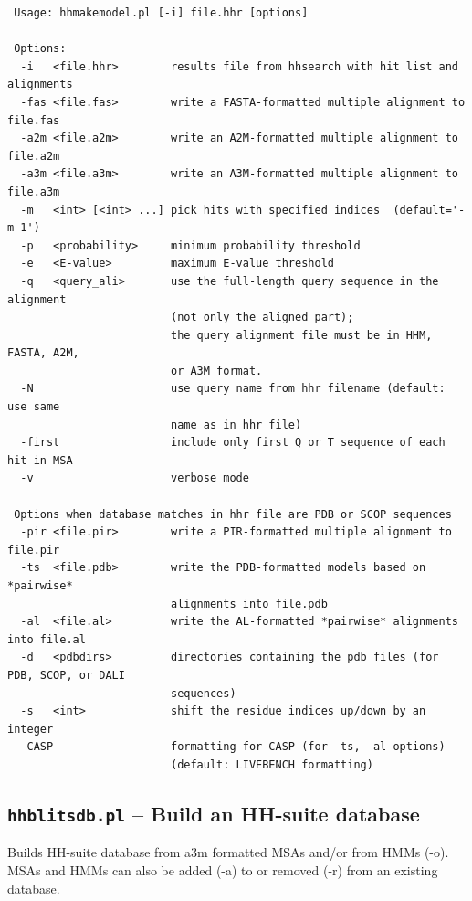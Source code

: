 \documentclass[11pt,a4paper]{article}
\begin{document}
\small 
\begin{verbatim}
 Usage: hhmakemodel.pl [-i] file.hhr [options]

 Options:
  -i   <file.hhr>        results file from hhsearch with hit list and alignments
  -fas <file.fas>        write a FASTA-formatted multiple alignment to file.fas
  -a2m <file.a2m>        write an A2M-formatted multiple alignment to file.a2m
  -a3m <file.a3m>        write an A3M-formatted multiple alignment to file.a3m
  -m   <int> [<int> ...] pick hits with specified indices  (default='-m 1')
  -p   <probability>     minimum probability threshold     
  -e   <E-value>         maximum E-value threshold      
  -q   <query_ali>       use the full-length query sequence in the alignment 
                         (not only the aligned part);
                         the query alignment file must be in HHM, FASTA, A2M,  
                         or A3M format.
  -N                     use query name from hhr filename (default: use same  
                         name as in hhr file)
  -first                 include only first Q or T sequence of each hit in MSA
  -v                     verbose mode

 Options when database matches in hhr file are PDB or SCOP sequences
  -pir <file.pir>        write a PIR-formatted multiple alignment to file.pir 
  -ts  <file.pdb>        write the PDB-formatted models based on *pairwise*  
                         alignments into file.pdb
  -al  <file.al>         write the AL-formatted *pairwise* alignments into file.al
  -d   <pdbdirs>         directories containing the pdb files (for PDB, SCOP, or DALI  
                         sequences)
  -s   <int>             shift the residue indices up/down by an integer           
  -CASP                  formatting for CASP (for -ts, -al options) 
                         (default: LIVEBENCH formatting)
\end{verbatim} 
\normalsize


\subsection{{\tt hhblitsdb.pl} -- Build an HH-suite database }

Builds HH-suite database from a3m formatted MSAs and/or from HMMs (-o).
MSAs and HMMs can also be added (-a) to or removed (-r) from an existing database. 
\end{document}
